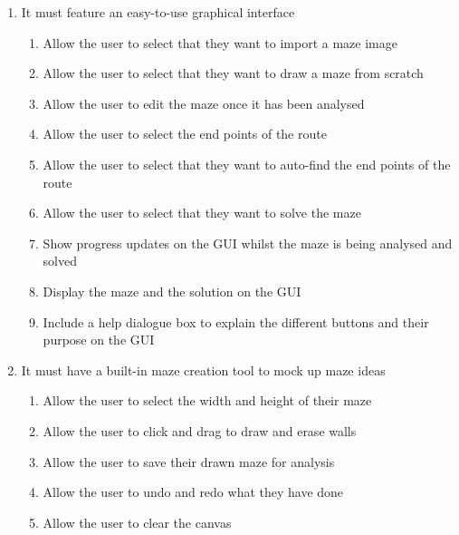 \documentclass[titlepage]{article}
\begin{document}
\begin{enumerate} [{Need }1:]
\item It must feature an easy-to-use graphical interface
\begin{enumerate} [{Obj 9.}1:]
\item Allow the user to select that they want to import a maze image
\item Allow the user to select that they want to draw a maze from scratch
\item Allow the user to edit the maze once it has been analysed
\item Allow the user to select the end points of the route
\item Allow the user to select that they want to auto-find the end points of the route
\item Allow the user to select that they want to solve the maze
\item Show progress updates on the GUI whilst the maze is being analysed and solved
\item Display the maze and the solution on the GUI
\item Include a help dialogue box to explain the different buttons and their purpose on the GUI
\end{enumerate}
\item It must have a built-in maze creation tool to mock up maze ideas
\begin{enumerate} [{Obj 10.}1:]
\item Allow the user to select the width and height of their maze
\item Allow the user to click and drag to draw and erase walls
\item Allow the user to save their drawn maze for analysis
\item Allow the user to undo and redo what they have done
\item	Allow the user to clear the canvas
\end{enumerate}
\end{enumerate}
\end{document}

